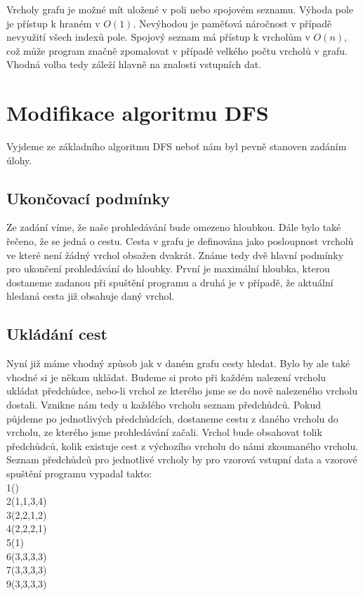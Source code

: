 \documentclass[
12pt,
a4paper,
pdftex,
czech,
titlepage
]{report}
\begin{document}
Vrcholy grafu je možné mít uložené v poli nebo spojovém seznamu. Výhoda pole je přístup k hraném v $O(1)$. Nevýhodou je paměťová náročnost v případě nevyužití všech indexů pole. Spojový seznam má přístup k vrcholům v $O(n)$, což může program značně zpomalovat v případě velkého počtu vrcholů v grafu. Vhodná volba tedy záleží hlavně na znalosti vstupních dat.

\section{Modifikace algoritmu DFS}
Vyjdeme ze základního algoritmu DFS neboť nám byl pevně stanoven zadáním úlohy.

\subsection{Ukončovací podmínky}
 Ze zadání víme, že naše prohledávání bude omezeno hloubkou. Dále bylo také řečeno, že se jedná o cestu. Cesta v grafu je definována jako posloupnost vrcholů ve které není žádný vrchol obsažen dvakrát. Známe tedy dvě hlavní podmínky pro ukončení prohledávání do hloubky. První je maximální hloubka, kterou dostaneme zadanou při spuštění programu a druhá je v případě, že aktuální hledaná cesta již obsahuje daný vrchol.
 
 \subsection{Ukládání cest}
  Nyní již máme vhodný způsob jak v daném grafu cesty hledat. Bylo by ale také vhodné si je někam ukládat. Budeme si proto při každém nalezení vrcholu ukládat předchůdce, nebo-li vrchol ze kterého jsme se do nově nalezeného vrcholu dostali. Vznikne nám tedy u každého vrcholu seznam předchůdců. Pokud půjdeme po jednotlivých předchůdcích, dostaneme cestu z daného vrcholu do vrcholu, ze kterého jsme prohledávání začali. Vrchol bude obsahovat tolik předchůdců, kolik existuje cest z výchozího vrcholu do námi zkoumaného vrcholu.\\
  
  Seznam předchůdců pro jednotlivé vrcholy by pro vzorová vstupní data a vzorové spuštění programu vypadal takto:\\
  
  1()\\
  2(1,1,3,4)\\
  3(2,2,1,2)\\
  4(2,2,2,1)\\
  5(1)\\
  6(3,3,3,3)\\
  7(3,3,3,3)\\
  9(3,3,3,3)\\
  
\end{document}
